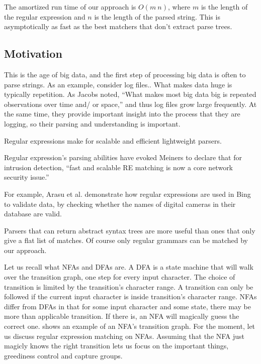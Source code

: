 \documentclass[english]{sigplanconf}
\theoremstyle{definition}
\begin{document}
The amortized run time of our approach is $O(m\: n)$, where $m$
is the length of the regular expression and $n$ is the length of
the parsed string. This is asymptotically as fast as the best matchers
that don't extract parse trees. 

\subsection{Motivation}

This is the age of big data, and the first step of processing big
data is often to parse strings. As an example, consider log files..
What makes data huge is typically repetition. As Jacobs\cite{Jacobs2009}
noted, ``What makes most big data big is repeated observations over
time and/ or space,'' and thus log files grow large frequently. At
the same time, they provide important insight into the process that
they are logging, so their parsing and understanding is important. 

Regular expressions make for scalable and efficient lightweight parsers.\cite{Karttunen1996} 

Regular expression's parsing abilities have evoked Meiners to declare
that for intrusion detection, ``fast and scalable RE matching is
now a core network security issue.'' \cite{Meiners2010}

For example, Arasu et al.\cite{Arasu2012} demonstrate how regular
expressions are used in Bing to validate data, by checking whether
the names of digital cameras in their database are valid.

Parsers that can return abstract syntax trees are more useful than
ones that only give a flat list of matches. Of course only regular
grammars can be matched by our approach.

Let us recall what NFAs and DFAs are. A DFA is a state machine that
will walk over the transition graph, one step for every input
character. The choice of transition is limited by the transition's
character range. A transition can only be followed if the current
input character is inside transition's character range. NFAs differ
from DFAs in that for some input character and some state, there may
be more than applicable transition. If there is, an NFA will magically
guess the correct one.  shows an example of
an NFA's transition graph. For the moment, let us discuss regular
expression matching on NFAs. Assuming that the NFA just magicly knows
the right transition lets us focus on the important things, greediness control
and capture groups.
\end{document}
